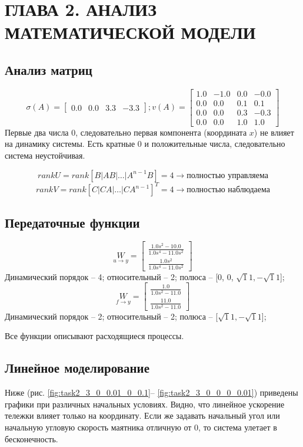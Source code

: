 \section{ГЛАВА 2. АНАЛИЗ МАТЕМАТИЧЕСКОЙ МОДЕЛИ}

\subsection{Анализ матриц}
\[\sigma(A) = \begin{bmatrix}
  0.0 &  0.0 &  3.3 & -3.3
\end{bmatrix}; v(A) = \begin{bmatrix}
  1.0 & -1.0 &  0.0 & -0.0\\
  0.0 &  0.0 &  0.1 &  0.1\\
  0.0 &  0.0 &  0.3 & -0.3\\
  0.0 &  0.0 &  1.0 &  1.0
\end{bmatrix} \]
Первые два числа 0, следовательно первая компонента (координата \(x\)) не влияет на динамику системы. Есть кратные 0 и положительные числа, следовательно система неустойчивая. 

\[rankU = rank[B | AB | \hdots | A^{n-1}B] = 4 \rightarrow \text{полностью управляема}\]
\[rankV = rank[C | CA | \hdots | CA^{n-1}]^T = 4 \rightarrow \text{полностью наблюдаема}\]

\subsection{Передаточные функции}
\[\underset{u \to y}W = \begin{bmatrix} \frac{1.0 s^{2} - 10.0}{1.0 s^{4} - 11.0 s^{2}} \\ \frac{1.0 s^{2}}{1.0 s^{4} - 11.0 s^{2}} \end{bmatrix} \]
Динамический порядок -- 4; относительный -- 2; полюса -- [0, 0, \(\sqrt11, -\sqrt11\)];
\[\underset{f \to y}W = \begin{bmatrix} \frac{1.0}{1.0 s^{2} - 11.0} \\ \frac{11.0}{1.0 s^{2} - 11.0} \end{bmatrix} \]
Динамический порядок -- 2; относительный -- 2; полюса -- [\(\sqrt11, -\sqrt11\)];

Все функции описывают расходящиеся процессы.

\subsection{Линейное моделирование}
Ниже (рис. \ref{fig:task2_3_0_0.01_0_0.1}-- \ref{fig:task2_3_0_0_0_0.01}) приведены графики при различных начальных условиях. Видно, что линейное ускорение тележки влияет только на координату. Если же задавать начальный угол или начальную угловую скорость маятника отличную от 0, то система улетает в бесконечность. 

